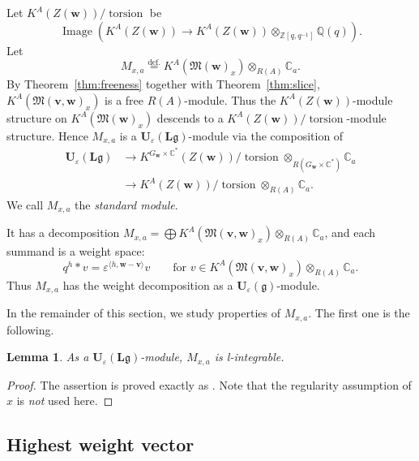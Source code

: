 \documentclass[12pt]{amsart}
\def\Bbb{\mathbb}
\def\frak{\mathfrak}
\newtheorem{Lemma}[equation]{Lemma}
\theoremstyle{definition}
\theoremstyle{remark}
\numberwithin{equation}{subsection}
\newcommand{\thmref}[1]{Theorem~\ref{#1}}
\newcommand{\defeq}{\overset{\operatorname{\scriptstyle def.}}{=}}
\newcommand{\C}{{\Bbb C}}
\newcommand{\Z}{{\Bbb Z}}
\newcommand{\Q}{{\Bbb Q}}
\newcommand{\R}{{\Bbb R}}
\newcommand{\M}{{\frak M}} %
\newcommand{\bv}{{\mathbf v}} %
\newcommand{\bw}{{\mathbf w}} %
\newcommand{\Ue}{{\mathbf U}_{\varepsilon}(\mathfrak g)}
\newcommand{\Ule}{{\mathbf U}_{\varepsilon}({\mathbf L}\mathfrak g)}
\newcommand{\Zw}{Z(\bw)}
\newcommand{\Mw}{\M(\bw)}
\begin{document}
Let $K^{A}(\Zw)/\!\operatorname{torsion}$ be
\[
   \operatorname{Image}\left(K^{A}(\Zw)
     \to
   K^{A}(\Zw)\otimes_{\Z[q,q^{-1}]}\Q(q) 
   \right).
\]
Let
\begin{equation}\label{eq:standmod}
  M_{x,a} \defeq K^A(\Mw_x)\otimes_{R(A)}\C_a.
\end{equation}
By \thmref{thm:freeness} together with \thmref{thm:slice},
$K^A(\M(\bv,\bw)_x)$ is a free $R(A)$-module.
Thus the $K^A(\Zw)$-module structure on $K^A(\Mw_x)$ descends to
a $K^A(\Zw)/\!\operatorname{torsion}$-module structure.
Hence $M_{x,a}$ is a $\Ule$-module via the composition of
\begin{equation}\label{eq:homA}
\begin{split}
   \Ule & \to
   K^{G_\bw\times\C^*}(\Zw)
    /\!\operatorname{torsion}\otimes_{R(G_\bw\times\C^*)}\C_a \\
   & \to K^{A}(\Zw)
       /\!\operatorname{torsion}\otimes_{R(A)}\C_a.
\end{split}
\end{equation}
We call $M_{x,a}$ the {\it standard module}.

It has a decomposition
$M_{x,a} = \bigoplus K^A(\M(\bv,\bw)_x)\otimes_{R(A)}\C_a$, and
each summand is a weight space:
\begin{equation}\label{eq:weightdec}
  q^h\ast v = \varepsilon^{\langle h, \bw - \bv\rangle} v
  \qquad\text{for $v\in K^A(\M(\bv,\bw)_x)\otimes_{R(A)}\C_a$}.
\end{equation}
Thus $M_{x,a}$ has the weight decomposition as a $\Ue$-module.

In the remainder of this section, we study properties of
$M_{x,a}$. The first one is the following.
\begin{Lemma}\label{lem:lint}
As a $\Ule$-module, $M_{x,a}$ is {\it l\/}-integrable.
\end{Lemma}
\begin{proof}
The assertion is proved exactly as \cite[9.3]{Na-alg}.
Note that the regularity assumption of $x$ is {\it not\/} used here.
\end{proof}

\subsection{Highest weight vector}\label{subsec:hwvector}
\end{document}
